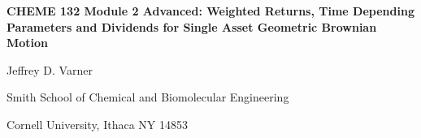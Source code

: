 \documentclass[11pt]{article}
\theoremstyle{definition}
\begin{document}
{\par\centering\textbf{\Large CHEME 132 Module 2 Advanced: Weighted Returns, Time Depending Parameters and Dividends for Single Asset Geometric Brownian Motion}}
\vspace{0.2in}
{\par \centering \large{Jeffrey D. Varner}}
\vspace{0.05in}
{\par \centering \large{Smith School of Chemical and Biomolecular Engineering}}
{\par \centering \large{Cornell University, Ithaca NY 14853}}

\date{}
\thispagestyle{empty}

\setcounter{page}{1}
\end{document}
